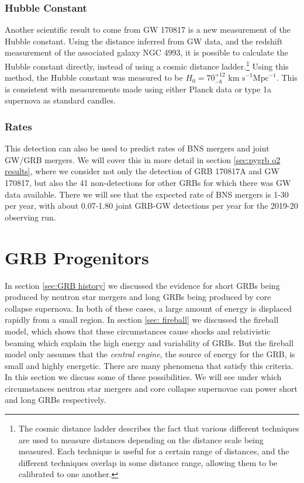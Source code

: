 \documentclass[11pt]{cuthesis}
\begin{document}
\subsubsection{Hubble Constant}
Another scientific result to come from GW 170817 is a new measurement of the Hubble constant. Using the distance inferred from GW data, and the redshift measurement of the associated galaxy NGC 4993, it is possible to calculate the Hubble constant directly, instead of using a cosmic distance ladder.\footnote{The cosmic distance ladder describes the fact that various different techniques are used to measure distances depending on the distance scale being measured. Each technique is useful for a certain range of distances, and the different techniques overlap in some distance range, allowing them to be calibrated to one another.} Using this method, the Hubble constant was measured to be $H_0 = 70^{+12}_{-8} \text{ km s}^{-1} \text{Mpc}^{-1}$. This is consistent with measurements made using either Planck data or type 1a supernova as standard candles. 

\subsubsection{Rates}
This detection can also be used to predict rates of BNS mergers and joint GW/GRB mergers. We will cover this in more detail in section \ref{sec:pygrb o2 results}, where we consider not only the detection of GRB 170817A and GW 170817, but also the 41 non-detections for other GRBs for which there was GW data available. There we will see that the expected rate of BNS mergers is 1-30 per year, with about 0.07-1.80 joint GRB-GW detections per year for the 2019-20 observing run.


\section{GRB Progenitors} \label{sec: grb prog}
In section \ref{sec:GRB history} we discussed the evidence for short GRBs being produced by neutron star mergers and long GRBs being produced by core collapse supernova. In both of these cases, a large amount of energy is displaced rapidly from a small region. In section \ref{sec: fireball} we discussed  the fireball model, which shows that these circumstances cause shocks and relativistic beaming which explain the high energy and variability of GRBs. But the fireball model only assumes that the \textit{central engine}, the source of energy for the GRB, is small and highly energetic. There are many phenomena that satisfy this criteria. In this section we discuss some of these possibilities. We will see under which circumstances neutron star mergers and core collapse supernovae can power short and long GRBs respectively.
\end{document}
